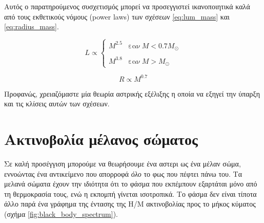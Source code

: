 Αυτός ο παρατηρούμενος συσχετισμός μπορεί να προσεγγιστεί ικανοποιητικά καλά από τους εκθετικούς νόμους (power laws) των σχέσεων \eqref{eq:lum_mass} και \eqref{eq:radius_mass}.

\begin{equation}
    \label{eq:lum_mass}
    L \propto 
    \begin{cases}
        M^{2.5} & \text{εαν} \ M < 0.7 M_{\odot} \\\\
        M^{3.8} & \text{εαν} \ M > M_{\odot}
    \end{cases}
\end{equation}

\begin{equation}
    \label{eq:radius_mass}
    R \propto M^{0.7}
\end{equation}

Προφανώς, χρειαζόμαστε μία θεωρία αστρικής εξέλιξης η οποία να εξηγεί την ύπαρξη και τις κλίσεις αυτών των σχέσεων.


\section{Ακτινοβολία μέλανος σώματος}


Σε καλή προσέγγιση μπορούμε να θεωρήσουμε ένα αστερι ως ένα μέλαν σώμα, εννοώντας ένα αντικείμενο που απορροφά \textit{όλο} το φως που πέφτει πάνω του. Τα μελανά σώματα έχουν την ιδιότητα ότι το φάσμα που εκπέμπουν εξαρτάται μόνο από τη θερμοκρασία τους, ενώ η εκπομπή γίνεται ισοτροπικά. Το φάσμα δεν είναι τίποτα άλλο παρά ένα γράφημα της έντασης της Η/Μ ακτινοβολίας προς το μήκος κύματος (σχήμα \ref{fig:black_body_spectrum}).

